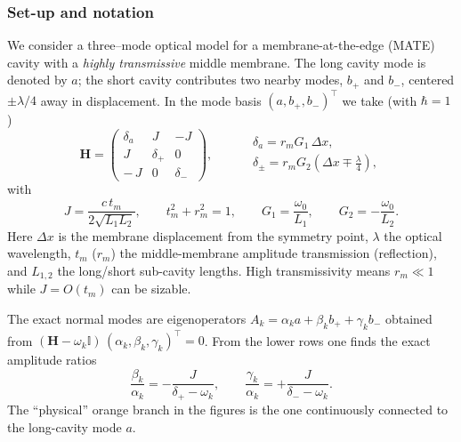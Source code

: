 \subsubsection*{Set-up and notation}
We consider a three–mode optical model for a membrane-at-the-edge (MATE) cavity with a \emph{highly transmissive} middle membrane. The long cavity mode is denoted by \(a\); the short cavity contributes two nearby modes, \(b_{+}\) and \(b_{-}\), centered \(\pm \lambda/4\) away in displacement. In the mode basis \((a,b_+,b_-)^\top\) we take (with \(\hbar=1\))
\begin{equation}
\label{eq:H}
\mathbf H=
\begin{pmatrix}
\delta_a & J & -J\\[2pt]
J & \delta_+ & 0\\[2pt]
-\,J & 0 & \delta_-
\end{pmatrix},
\qquad
\begin{aligned}
&\delta_a = r_m G_1\,\Delta x,\\
&\delta_\pm = r_m G_2\!\left(\Delta x \mp \frac{\lambda}{4}\right),
\end{aligned}
\end{equation}
with
\begin{equation}
J=\frac{c\,t_m}{2\sqrt{L_1L_2}},\qquad
t_m^2+r_m^2=1,\qquad
G_1=\frac{\omega_0}{L_1},\qquad
G_2=-\frac{\omega_0}{L_2}.
\end{equation}
Here \(\Delta x\) is the membrane displacement from the symmetry point, \(\lambda\) the optical wavelength, \(t_m\) (\(r_m\)) the middle-membrane amplitude transmission (reflection), and \(L_{1,2}\) the long/short sub-cavity lengths. High transmissivity means \(r_m\ll 1\) while \(J=O(t_m)\) can be sizable.

The exact normal modes are eigenoperators \(A_k=\alpha_k a+\beta_k b_+ + \gamma_k b_-\) obtained from \((\mathbf H-\omega_k\mathbb I)\,(\alpha_k,\beta_k,\gamma_k)^\top=0\). From the lower rows one finds the exact amplitude ratios
\begin{equation}
\label{eq:ratios}
\frac{\beta_k}{\alpha_k}=-\frac{J}{\delta_+-\omega_k},
\qquad
\frac{\gamma_k}{\alpha_k}=+\frac{J}{\delta_--\omega_k}.
\end{equation}
The ``physical'' orange branch in the figures is the one continuously connected to the long-cavity mode \(a\).

